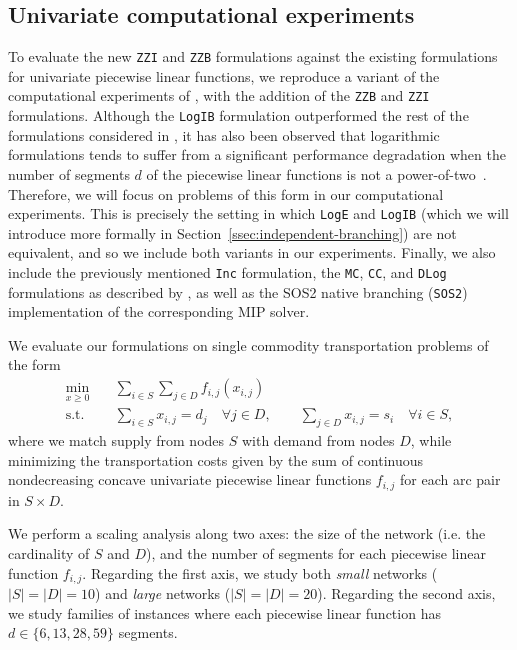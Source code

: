 \documentclass[opre,nonblindrev]{informs3} %
\newcommand{\ZZB}{\texttt{ZZB}}
\newcommand{\ZZI}{\texttt{ZZI}}
\newcommand{\MC}{\texttt{MC}}
\newcommand{\CC}{\texttt{CC}}
\newcommand{\Log}{\texttt{LogE}}
\newcommand{\LogIB}{\texttt{LogIB}}
\newcommand{\DLog}{\texttt{DLog}}
\newcommand{\Inc}{\texttt{Inc}}
\newcommand{\SOS}{\texttt{SOS2}}
\begin{document}
\subsection{Univariate computational experiments} \label{ss:univariate-computational-results}
To evaluate the new \ZZI{} and \ZZB{} formulations against the existing formulations for univariate piecewise linear functions, we reproduce a variant of the computational experiments of \cite{Vielma:2010}, with the addition of the \ZZB{} and \ZZI{} formulations. Although the \LogIB{} formulation outperformed the rest of the formulations considered in \cite{Vielma:2010}, it has also been observed that logarithmic formulations tends to suffer from a significant performance degradation when the number of segments $d$ of the piecewise linear functions is not a power-of-two~\citep{Vielma:2009a,Coppersmith:2005,Muldoon:2012,Muldoon:2013}. Therefore, we will focus on problems of this form in our computational experiments. This is precisely the setting in which \Log{} and \LogIB{} (which we will introduce more formally in Section~\ref{ssec:independent-branching}) are not equivalent, and so we include both variants in our experiments. Finally, we also include the previously mentioned \Inc{} formulation, the \MC{}, \CC{}, and \DLog{} formulations as described by \cite{Vielma:2010}, as well as the SOS2 native branching (\SOS{}) implementation of the corresponding MIP solver. 

We evaluate our formulations on single commodity transportation problems of the form
\begin{align*}
\min_{x \geq 0}\quad& \sum_{i \in S} \sum_{j \in D} f_{i,j}(x_{i,j}) \\
\text{s.t.}\quad& \sum_{i \in S} x_{i,j} = d_j \quad \forall j \in D, \quad \quad \sum_{j \in D} x_{i,j} = s_i \quad \forall i \in S,
\end{align*}
where we match supply from nodes $S$ with demand from nodes $D$, while minimizing the transportation costs given by the sum of continuous nondecreasing concave univariate piecewise linear functions $f_{i,j}$ for each arc pair in $S \times D$.

We perform a scaling analysis along two axes: the size of the network (i.e. the cardinality of $S$ and $D$), and the number of segments for each piecewise linear function $f_{i,j}$. Regarding the first axis, we study both \emph{small} networks ($|S|=|D|=10$) and \emph{large} networks ($|S|=|D|=20$). Regarding the second axis, we study families of instances where each piecewise linear function has $d \in \{6,13,28,59\}$ segments.
\end{document}
